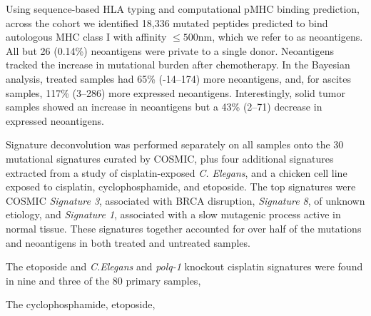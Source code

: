 



Using sequence-based HLA typing and computational pMHC binding prediction, across the cohort we identified 18,336 mutated peptides predicted to bind autologous MHC class I with affinity $\leq 500$nm, which we refer to as neoantigens. All but 26 (0.14\%) neoantigens were private to a single donor. Neoantigens tracked the increase in mutational burden after chemotherapy. In the Bayesian analysis, treated samples had 65\% (-14--174) more neoantigens, and, for ascites samples, 117\% (3--286) more expressed neoantigens. Interestingly, solid tumor samples showed an increase in neoantigens but a 43\% (2--71) decrease in expressed neoantigens.

Signature deconvolution was performed separately on all samples onto the 30 mutational signatures curated by COSMIC\cite{364242}, plus four additional signatures extracted from a study of cisplatin-exposed \textit{C. Elegans}\cite{Meier_2014}, and a chicken cell line exposed to cisplatin, cyclophosphamide, and etoposide\cite{Szikriszt_2016}. The top signatures were COSMIC \textit{Signature 3}, associated with BRCA disruption, \textit{Signature 8}, of unknown etiology, and \textit{Signature 1}, associated with a slow mutagenic process active in normal tissue. These signatures together accounted for over half of the mutations and neoantigens in both treated and untreated samples.

The etoposide and \textit{C.Elegans} and \textit{polq-1} knockout cisplatin signatures were found in nine and three of the 80 primary samples, 

The cyclophosphamide, etoposide,  

